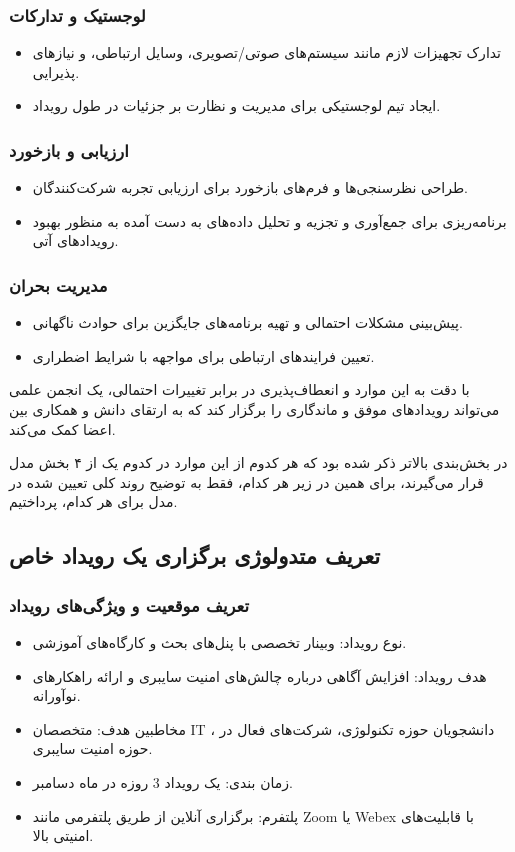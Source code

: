 \subsubsection*{لوجستیک و تدارکات}
\begin{itemize}
	\item تدارک تجهیزات لازم مانند سیستم‌های صوتی/تصویری، وسایل ارتباطی، و نیازهای پذیرایی.
	\item ایجاد تیم لوجستیکی برای مدیریت و نظارت بر جزئیات در طول رویداد.
\end{itemize}

\subsubsection*{ارزیابی و بازخورد}
\begin{itemize}
	\item طراحی نظرسنجی‌ها و فرم‌های بازخورد برای ارزیابی تجربه شرکت‌کنندگان.
	\item برنامه‌ریزی برای جمع‌آوری و تجزیه و تحلیل داده‌های به دست آمده به منظور بهبود رویدادهای آتی.
\end{itemize}

\subsubsection*{مدیریت بحران}
\begin{itemize}
	\item پیش‌بینی مشکلات احتمالی و تهیه برنامه‌های جایگزین برای حوادث ناگهانی.
	\item تعیین فرایندهای ارتباطی برای مواجهه با شرایط اضطراری. 
\end{itemize}

با دقت به این موارد و انعطاف‌پذیری در برابر تغییرات احتمالی، یک انجمن علمی می‌تواند رویدادهای موفق و ماندگاری را برگزار کند که به ارتقای دانش و همکاری بین اعضا کمک می‌کند.

در بخش‌بندی بالاتر ذکر شده بود که هر کدوم از این موارد در کدوم یک از ۴ بخش مدل قرار می‌گیرند، برای همین در زیر هر کدام، فقط به توضیح روند کلی تعیین شده در مدل برای هر کدام، پرداختیم.

\subsection*{تعریف متدولوژی برگزاری یک رویداد خاص}

\subsubsection*{تعریف موقعیت و ویژگی‌های رویداد}
\begin{itemize}
	\item نوع رویداد: وبینار تخصصی با پنل‌های بحث و کارگاه‌های آموزشی.
	\item هدف رویداد: افزایش آگاهی درباره چالش‌های امنیت سایبری و ارائه راهکارهای نوآورانه.
	\item مخاطبین هدف: متخصصان IT ، دانشجویان حوزه تکنولوژی، شرکت‌های فعال در حوزه امنیت سایبری.
	\item زمان بندی: یک رویداد 3 روزه در ماه دسامبر.
	\item پلتفرم: برگزاری آنلاین از طریق پلتفرمی مانند Zoom یا Webex با قابلیت‌های امنیتی بالا.
\end{itemize}

